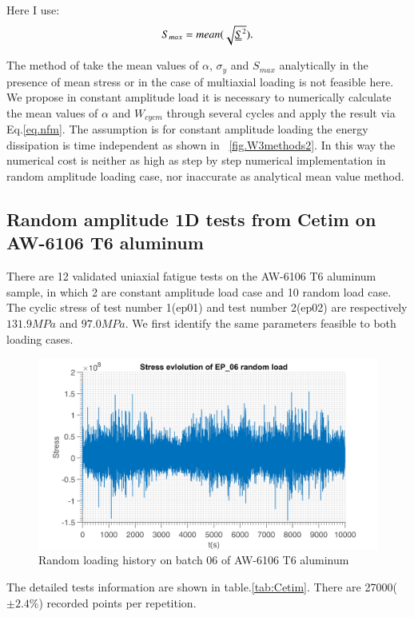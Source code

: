 \documentclass[3p,times,number,review]{elsarticle}
\newcommand{\figref}[1]{\figurename~\ref{#1}}
\begin{document}
Here I use:
$$S_{max}=mean(\sqrt{\uuline{S}^2}).$$

The method of take the mean values of $\alpha$, $\sigma_y$ and $S_{max}$ analytically in the presence of mean stress or in the case of multiaxial loading is not feasible here. We propose in constant amplitude load it is necessary to numerically calculate the mean values of $\alpha$ and $W_{cycm}$ through several cycles and apply the result via  Eq.\eqref{eq.nfm}. The assumption is for constant amplitude loading the energy dissipation is time independent as shown in \figref{fig.W3methods2}. In this way the numerical cost is neither as high as step by step numerical implementation in random amplitude loading case, nor inaccurate as analytical mean value method. 

\newpage
\subsection{Random amplitude 1D tests from Cetim on AW-6106 T6 aluminum}

There are 12 validated uniaxial fatigue tests on the AW-6106 T6 aluminum sample, in which 2 are constant amplitude load case and 10 random  load case. 
The cyclic stress of test number 1(ep01) and test number 2(ep02) are respectively $131.9MPa$ and $97.0MPa$. We first identify the same parameters feasible to both loading cases. 

\begin{figure}[!h]
	\centering
	\includegraphics[width=\textwidth]{figures//ep_06_stress.png} 
	\caption{Random loading history on batch 06 of AW-6106 T6 aluminum}
\end{figure}	
The detailed tests information are shown in table.\ref{tab:Cetim}. There are 27000($\pm 2.4\%$) recorded points per repetition. 
\end{document}
